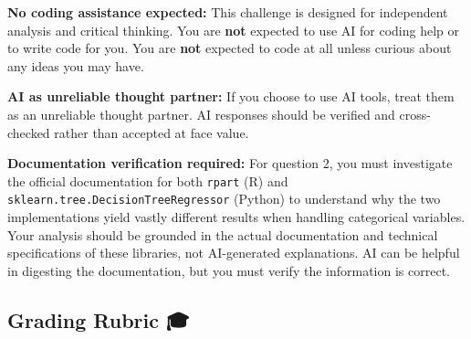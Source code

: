 \documentclass[
  letterpaper,
  DIV=11,
  numbers=noendperiod]{scrartcl}
\begin{document}
\begin{tcolorbox}[enhanced jigsaw, coltitle=black, colframe=quarto-callout-important-color-frame, bottomtitle=1mm, colbacktitle=quarto-callout-important-color!10!white, breakable, title=\textcolor{quarto-callout-important-color}{\faExclamation}\hspace{0.5em}{📋 Important Note on AI Usage}, rightrule=.15mm, colback=white, titlerule=0mm, arc=.35mm, left=2mm, opacitybacktitle=0.6, leftrule=.75mm, toptitle=1mm, bottomrule=.15mm, toprule=.15mm, opacityback=0]

\textbf{No coding assistance expected:} This challenge is designed for
independent analysis and critical thinking. You are \textbf{not}
expected to use AI for coding help or to write code for you. You are
\textbf{not} expected to code at all unless curious about any ideas you
may have.

\textbf{AI as unreliable thought partner:} If you choose to use AI
tools, treat them as an unreliable thought partner. AI responses should
be verified and cross-checked rather than accepted at face value.

\textbf{Documentation verification required:} For question 2, you must
investigate the official documentation for both \texttt{rpart} (R) and
\texttt{sklearn.tree.DecisionTreeRegressor} (Python) to understand why
the two implementations yield vastly different results when handling
categorical variables. Your analysis should be grounded in the actual
documentation and technical specifications of these libraries, not
AI-generated explanations. AI can be helpful in digesting the
documentation, but you must verify the information is correct.

\end{tcolorbox}

\subsection{Grading Rubric 🎓}\label{grading-rubric}
\end{document}
